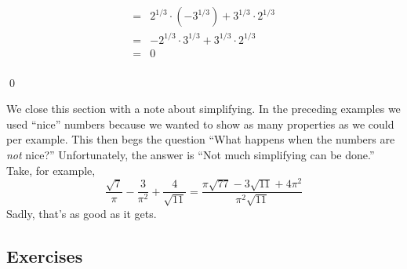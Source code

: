 \begin{ex}
\begin{enumerate}
\[\begin{array}{rclr}
& = & 2^{1/3} \cdot (-3^{1/3}) +3^{1/3} \cdot 2^{1/3}  & \\ [3pt]

& = &  - 2^{1/3} \cdot 3^{1/3} +3^{1/3} \cdot 2^{1/3}  & \\ [3pt]

& = & 0 & \\ \end{array} \] 

\vspace{-.3in} \qed

\end{enumerate}

\end{ex}

\medskip

We close this section with a note about simplifying.  In the preceding examples we used ``nice'' numbers because we wanted to show as many properties as we could per example. This then begs the question ``What happens when the numbers are \emph{not} nice?''  Unfortunately, the answer is ``Not much simplifying can be done.''  Take, for example,\[\frac{\sqrt{7}}{\pi} - \frac{3}{\pi^{2}} + \frac{4}{\sqrt{11}} = \frac{\pi\sqrt{77} - 3\sqrt{11} + 4\pi^{2}}{\pi^{2}\sqrt{11}}\]Sadly, that's as good as it gets.

\newpage

\subsection{Exercises}



\closegraphsfile